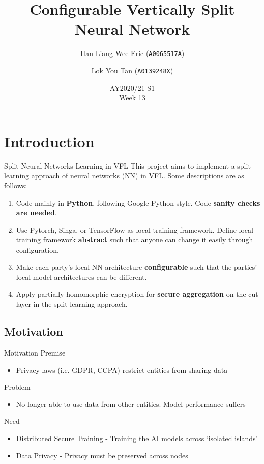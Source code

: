 \documentclass[xcolor=dvipsnames]{beamer}
\title{Configurable Vertically Split Neural Network}
\author{
  Han Liang Wee Eric (\texttt{A0065517A})\\
  \and
  Lok You Tan (\texttt{A0139248X})
}
\institute[National University of Singapore] %
{
}
\date{AY2020/21 S1\\ Week 13}
\begin{document}
\begin{frame}
  \titlepage
\end{frame}

\section{Introduction}
\begin{frame}{Split Neural Networks Learning in VFL}
  This project aims to implement a split learning approach of neural networks (NN) in VFL. Some
descriptions are as follows:
  \begin{enumerate}
    \item Code mainly in {\bf Python}, following Google Python style. Code {\bf sanity checks are needed}.
    \item Use Pytorch, Singa, or TensorFlow as local training framework. Define local training framework {\bf abstract} such that anyone can change it easily through configuration.
    \item Make each party’s local NN architecture {\bf configurable} such that the parties’ local model architectures can be different.
    \item Apply partially homomorphic encryption for {\bf secure aggregation} on the cut layer in the split learning approach.
  \end{enumerate}
\end{frame}

\subsection{Motivation}
\begin{frame}{Motivation}
  Premise
  \begin{itemize}
    \item Privacy laws (i.e. GDPR, CCPA) restrict entities from sharing data
  \end{itemize}
  Problem
  \begin{itemize}
      \item No longer able to use data from other entities. Model performance suffers
  \end{itemize}
  Need
  \begin{itemize}
      \item Distributed Secure Training - Training the AI models across `isolated islands'
    \item Data Privacy - Privacy must be preserved across nodes
  \end{itemize}
\end{frame}
\end{document}
